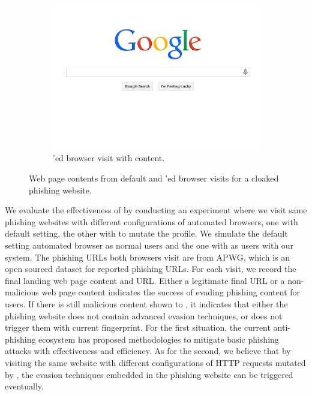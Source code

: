 \begin{figure}
\begin{subfigure}[tb]{.31\textwidth}
		\includegraphics[width=\linewidth]{figs/netflix_sp2.png}
        \caption{\spartacus'ed browser visit with content.}
        \label{fig:sp2}
	\end{subfigure}%
	\quad
	\vspace{-5pt}
	\caption{Web page contents from default and \spartacus'ed browser visits for a cloaked phishing website.}
	\label{fig:effectiveness}
	\vspace{-10pt}
\end{figure}

We evaluate the effectiveness of \spartacus by conducting an experiment where we visit same phishing websites with different configurations of automated browsers, one with default setting, the other with \spartacus to mutate the profile.
We simulate the default setting automated browser as normal users and the one with \spartacus as users with our system.
The phishing URLs both browsers visit are from APWG, which is an open sourced dataset for reported phishing URLs.
For each visit, we record the final landing web page content and URL.
Either a legitimate final URL or a non-malicious web page content indicates the success of \spartacus evading phishing content for users.
If there is still malicious content shown to \spartacus, it indicates that either the phishing website does not contain advanced evasion techniques, or \spartacus does not trigger them with current fingerprint.
For the first situation, the current anti-phishing ecosystem has proposed methodologies to mitigate basic phishing attacks with effectiveness and efficiency.
As for the second, we believe that by visiting the same website with different configurations of HTTP requests mutated by \spartacus, the evasion techniques embedded in the phishing website can be triggered eventually. 

